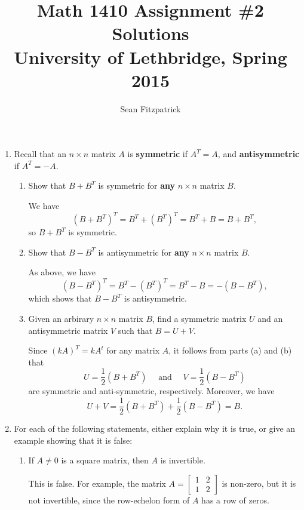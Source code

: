 \documentclass[letterpaper,12pt]{article}
\title{Math 1410 Assignment \#2 Solutions\\University of Lethbridge, Spring 2015}
\author{Sean Fitzpatrick}
\begin{document}
 \maketitle

\begin{enumerate}

\item Recall that an $n\times n$ matrix $A$ is {\bf symmetric} if $A^T=A$, and {\bf antisymmetric} if $A^T=-A$.
\begin{enumerate}
 \item Show that $B+B^T$ is symmetric for {\bf any} $n\times n$ matrix $B$.

\bigskip

 We have
\[
 (B+B^T)^T = B^T+(B^T)^T = B^T+B = B+B^T,
\]
so $B+B^T$ is symmetric.

\bigskip

 \item Show that $B-B^T$ is antisymmetric for {\bf any} $n\times n$ matrix $B$.

\bigskip

 As above, we have
\[
 (B-B^T)^T = B^T-(B^T)^T = B^T-B = -(B-B^T),
\]
which shows that $B-B^T$ is antisymmetric.

\bigskip

 \item Given an arbirary $n\times n$ matrix $B$, find a symmetric matrix $U$ and an antisymmetric matrix $V$ such that $B=U+V$.

\bigskip

 Since $(kA)^T = kA^t$ for any matrix $A$, it follows from parts (a) and (b) that 
\[
 U = \frac{1}{2}(B+B^T) \quad \text{ and } \quad V = \frac{1}{2}(B-B^T)
\]
are symmetric and anti-symmetric, respectively. Moreover, we have
\[
 U+V = \frac{1}{2}(B+B^T)+\frac{1}{2}(B-B^T) = B.
\]


\bigskip

\end{enumerate}
\item For each of the following statements, either explain why it is true, or give an example showing that it is false:
\begin{enumerate}
 \item If $A\neq 0$ is a square matrix, then $A$ is invertible.

\bigskip

 This is false. For example, the matrix $A=\begin{bmatrix}1&2\\1&2\end{bmatrix}$ is non-zero, but it is not invertible, since the row-echelon form of $A$ has a row of zeros.


\end{enumerate}
\end{enumerate}
\end{document}
